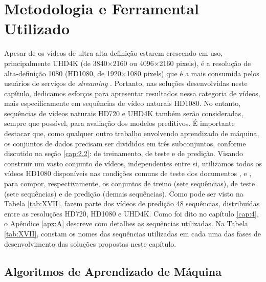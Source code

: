 \section{Metodologia e Ferramental Utilizado}
\label{cap:7.1}

Apesar de os vídeos de ultra alta definição estarem crescendo em uso, principalmente UHD4K (de 3840$\times$2160 ou 4096$\times$2160 pixels), é a resolução de alta-definição 1080 (HD1080, de 1920$\times$1080 pixels) que é a mais consumida pelos usuários de serviços de \textit{streaming} \cite{bib:bitmovin_twitter}. Portanto, nas soluções desenvolvidas neste capítulo, dedicamos esforços para apresentar resultados nessa categoria de vídeos, mais especificamente em sequências de vídeo naturais HD1080. No entanto, sequências de vídeos naturais HD720 e UHD4K também serão consideradas, sempre que possível, para avaliação dos modelos preditivos. É importante destacar que, como qualquer outro trabalho envolvendo aprendizado de máquina, os conjuntos de dados precisam ser divididos em três subconjuntos, conforme discutido na seção \ref{cap:2.2}: de treinamento, de teste e de predição. Visando construir um vasto conjunto de vídeos, independentes entre si, utilizamos todos os vídeos HD1080 disponíveis nas condições comuns de teste dos documentos \cite{bib:av2_avm}, \citet{bib:hevcctc} e \citet{bib:ietfnetvct}, para compor, respectivamente, os conjuntos de treino (sete sequências), de teste (sete sequências) e de predição (demais sequências). Como pode ser visto na Tabela \ref{tab:XVII}, fazem parte dos vídeos de predição 48 sequências, distribuídas entre as resoluções HD720, HD1080 e UHD4K. Como foi dito no capítulo \ref{cap:4}, o Apêndice \ref{apx:A} descreve com detalhes as sequências utilizadas. Na Tabela \ref{tab:XVII}, constam os nomes das sequências utilizadas em cada uma das fases de desenvolvimento das soluções propostas neste capítulo.



\subsection{Algoritmos de Aprendizado de Máquina}
\label{cap:7.1.3}

